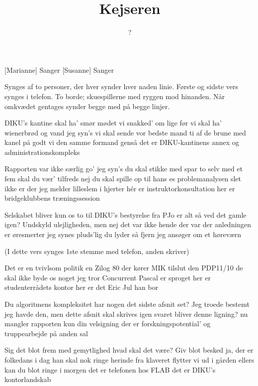 \documentclass[a4paper,11pt]{article}
\title{Kejseren}
\author{?}
\begin{document}
\maketitle

\begin{roles}
[Marianne] Sanger
[Susanne] Sanger
\end{roles}

Synges af to personer, der hver synder hver naden linie.  Første og
sidste vers synges i telefon.  To borde; skuespillerne med ryggen mod
hinanden.  Når omkvædet gentages synder begge med på begge linjer.

\begin{song}
DIKU's kantine skal ha' smør
mødet vi snakked' om lige før
vi skal ha' wienerbrød og vand
jeg syn's vi skal sende vor bedste mand
ti af de brune med kanel på
godt vi den samme formand genså
det er DIKU-kantinens annex
og administrationskompleks

Rapporten var ikke særlig go'
jeg syn's du skal stikke med spar to
selv med et fem skal du vær' tilfreds
nej du skal spille op til hans es
problemanalysen slet ikke er der
jeg melder lilleslem i hjerter
hér er instruktorkonsultation
her er bridgeklubbens træningssession

Selskabet bliver kun os to
til DIKU's bestyrelse fra PJo
er alt så ved det gamle igen?
Undskyld ulejligheden, men
nej det var ikke hende der var der
anledningen er øresmerter
jeg synes pluds'lig du lyder så fjern
jeg ansøger om et høreværn

(I dette vers synges 1ste stemme med telefon, anden skriver)

Det er en tvivlsom politik
en Zilog 80 der kører MIK
tilslut den PDP11/10
de skal ikke byde os noget
jeg tror Concurrent Pascal er sproget
her er studenterrådets kontor
her er det Eric Jul han bor

Du algoritmens kompleksitet
har nogen det sidste afsnit set?
Jeg troede bestemt jeg havde den, men
dette afsnit skal skrives igen
svaret bliver denne ligning?
nu mangler rapporten kun din velsigning
der er forskningspotential'
og truppearbejde på anden sal

Sig det blot frem med gemytlighed
hvad skal det være?  Giv blot besked
ja, der er folkedans i dag
han skal nok ringe herinde fra
klaveret flytter vi ud i gården
ellers kan du blot ringe i morgen
det er telefonen hos FLAB
det er DIKU's kontorlandskab
\end{song}
\end{document}
